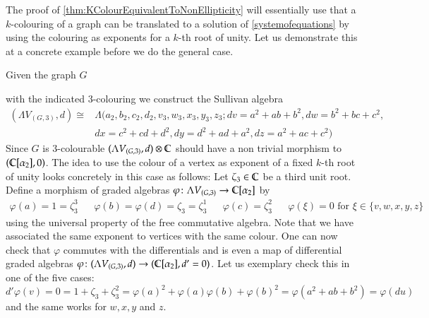  The proof of \ref{thm:KColourEquivalentToNonEllipticity} will essentially use that a $k$-colouring
 of a graph can be translated to a solution of \ref{systemofequations} by using the colouring
 as exponents for a $k$-th root of unity.
 Let us demonstrate this at a concrete example before we do the general case.
  \begin{Example}
   Given the graph $G$
   \begin{center}
    

   \end{center}

with the indicated $3$-colouring we construct the Sullivan algebra 
\begin{align*} 
(\Lambda V_{(G,3)},d) \cong &\Lambda(a_2,b_2,c_2,d_2,v_3,w_3,x_3,y_3,z_3 ; dv = a^2 + ab + b^2, dw = b^2 + bc + c^2, \\
 &dx = c^2 + cd + d^2, dy = d^2 + ad + a^2 , dz = a^2 + ac + c^2)
\end{align*}
Since $G$ is $3$-colourable $(\Lambda V_{(G,3)},d) \otimes \mathbb{C}$  should have a non trivial morphism to
$( \mathbb{C}[\alpha_2], 0)$. The idea to use the colour of a vertex as exponent of a fixed $k$-th root of unity looks 
concretely in this case as follows:
Let $\zeta_3 \in \mathbb{C}$ be a third unit root. Define a morphism of graded algebras
$\varphi \colon \Lambda V_{(G,3)} \to \mathbb{C} [ \alpha_2]$ by 
\begin{align*}
\varphi(a) = 1 = \zeta_3^3 & & \varphi(b) = \varphi(d) = \zeta_3 = \zeta_3^1&  & \varphi(c) = \zeta_3^2 & &
\text{$\varphi(\xi) = 0$ for $\xi \in \lbrace v,w,x,y,z \rbrace$} 
\end{align*}
using the universal property of the free commutative algebra. Note that we have associated the same exponent
to vertices with the same colour.
One can now check that $\varphi$ commutes with the differentials and is even a map of differential graded algebras
$\varphi \colon (\Lambda V_{(G,3)}, d) \to (\mathbb{C} [ \alpha_2],d' = 0)$. Let us exemplary check this in one of the five cases:
$$d'\varphi(v) = 0 = 1 + \zeta_3 + \zeta_3^2 = \varphi( a)^2 + \varphi( a)\varphi(b) + \varphi ( b)^2 = 
\varphi(a^2 + ab + b^2) = \varphi( du)$$
and the same works for $w,x,y$ and $z$. 
  \end{Example}

